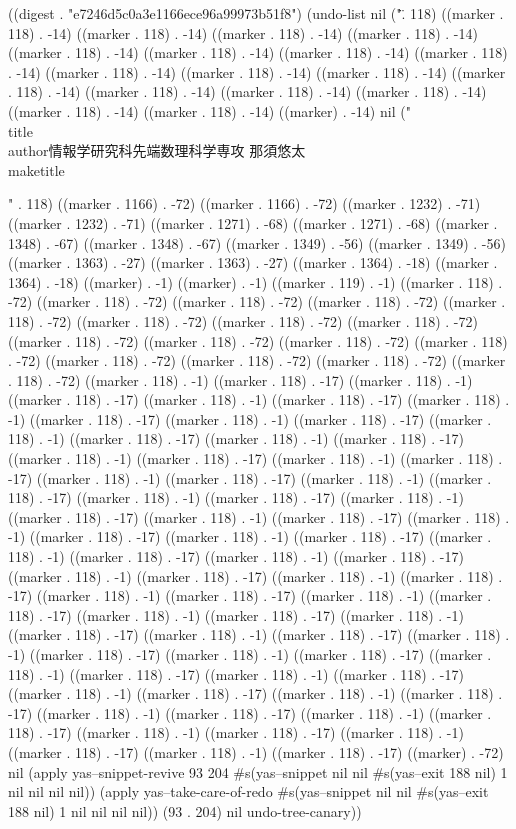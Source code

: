 
((digest . "e7246d5c0a3e1166ece96a99973b51f8") (undo-list nil ("\" . 118) ((marker . 118) . -14) ((marker . 118) . -14) ((marker . 118) . -14) ((marker . 118) . -14) ((marker . 118) . -14) ((marker . 118) . -14) ((marker . 118) . -14) ((marker . 118) . -14) ((marker . 118) . -14) ((marker . 118) . -14) ((marker . 118) . -14) ((marker . 118) . -14) ((marker . 118) . -14) ((marker . 118) . -14) ((marker . 118) . -14) ((marker . 118) . -14) ((marker . 118) . -14) ((marker) . -14) nil ("
\
\\title{}
\\author{情報学研究科先端数理科学専攻 那須悠太}
\\maketitle

  

" . 118) ((marker . 1166) . -72) ((marker . 1166) . -72) ((marker . 1232) . -71) ((marker . 1232) . -71) ((marker . 1271) . -68) ((marker . 1271) . -68) ((marker . 1348) . -67) ((marker . 1348) . -67) ((marker . 1349) . -56) ((marker . 1349) . -56) ((marker . 1363) . -27) ((marker . 1363) . -27) ((marker . 1364) . -18) ((marker . 1364) . -18) ((marker) . -1) ((marker) . -1) ((marker . 119) . -1) ((marker . 118) . -72) ((marker . 118) . -72) ((marker . 118) . -72) ((marker . 118) . -72) ((marker . 118) . -72) ((marker . 118) . -72) ((marker . 118) . -72) ((marker . 118) . -72) ((marker . 118) . -72) ((marker . 118) . -72) ((marker . 118) . -72) ((marker . 118) . -72) ((marker . 118) . -72) ((marker . 118) . -72) ((marker . 118) . -72) ((marker . 118) . -72) ((marker . 118) . -1) ((marker . 118) . -17) ((marker . 118) . -1) ((marker . 118) . -17) ((marker . 118) . -1) ((marker . 118) . -17) ((marker . 118) . -1) ((marker . 118) . -17) ((marker . 118) . -1) ((marker . 118) . -17) ((marker . 118) . -1) ((marker . 118) . -17) ((marker . 118) . -1) ((marker . 118) . -17) ((marker . 118) . -1) ((marker . 118) . -17) ((marker . 118) . -1) ((marker . 118) . -17) ((marker . 118) . -1) ((marker . 118) . -17) ((marker . 118) . -1) ((marker . 118) . -17) ((marker . 118) . -1) ((marker . 118) . -17) ((marker . 118) . -1) ((marker . 118) . -17) ((marker . 118) . -1) ((marker . 118) . -17) ((marker . 118) . -1) ((marker . 118) . -17) ((marker . 118) . -1) ((marker . 118) . -17) ((marker . 118) . -1) ((marker . 118) . -17) ((marker . 118) . -1) ((marker . 118) . -17) ((marker . 118) . -1) ((marker . 118) . -17) ((marker . 118) . -1) ((marker . 118) . -17) ((marker . 118) . -1) ((marker . 118) . -17) ((marker . 118) . -1) ((marker . 118) . -17) ((marker . 118) . -1) ((marker . 118) . -17) ((marker . 118) . -1) ((marker . 118) . -17) ((marker . 118) . -1) ((marker . 118) . -17) ((marker . 118) . -1) ((marker . 118) . -17) ((marker . 118) . -1) ((marker . 118) . -17) ((marker . 118) . -1) ((marker . 118) . -17) ((marker . 118) . -1) ((marker . 118) . -17) ((marker . 118) . -1) ((marker . 118) . -17) ((marker . 118) . -1) ((marker . 118) . -17) ((marker . 118) . -1) ((marker . 118) . -17) ((marker . 118) . -1) ((marker . 118) . -17) ((marker . 118) . -1) ((marker . 118) . -17) ((marker . 118) . -1) ((marker . 118) . -17) ((marker . 118) . -1) ((marker . 118) . -17) ((marker) . -72) nil (apply yas--snippet-revive 93 204 #s(yas--snippet nil nil #s(yas--exit 188 nil) 1 nil nil nil nil)) (apply yas--take-care-of-redo #s(yas--snippet nil nil #s(yas--exit 188 nil) 1 nil nil nil nil)) (93 . 204) nil undo-tree-canary))
